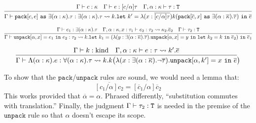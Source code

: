 \begin{judgment}
 \[
   \infer{\Gamma \vdash \pack{c}{e}{\exists(\alpha : \kappa).\tau}
     : \exists(\alpha : \kappa).\tau
     \leadsto k. \letv{k'}{\lambda(x : \overline{[c/\alpha]\tau})
     k(\pack{\overline{c}}{x}{\exists(\alpha : \kappabar).\taubar})}{\ebar}}
    {\Gamma \vdash c : \kappa
    &\Gamma \vdash e : [c/\alpha] \tau
    &\Gamma, \alpha : \kappa \vdash \tau : \T
    }
 \]

 \[
   \infer
     {\Gamma \vdash \unpack{\alpha}{x}{e_1}{e_2} : \tau_2
       \leadsto k. \letv{k_1}{(\lambda(y : \exists(\alpha : \kappabar).\taubar).
         \unpack{\alpha}{x}{y}{\letv{k_2}{k}{\ebar_2}})}{\ebar_1}}
     {\Gamma \vdash e_1 : \exists(\alpha : \kappa).\tau
     &\Gamma, \alpha : \kappa, x : \tau_1 \vdash e_2 : \tau_2 \leadsto \kappa_2.\ebar_2
     &\Gamma \vdash \tau_2 : \T
     }
 \]

 \[
   \infer{\Gamma \vdash \Lambda(\alpha : \kappa).e : \forall(\alpha : \kappa).\tau \leadsto
     k. k\big(\lambda(x : \exists(\alpha : \kappabar).\neg \taubar).
     \unpack{\alpha}{k'}{x}{\ebar}}
     {\Gamma \vdash k : \kind
     &\Gamma, \alpha : \kappa \vdash e : \tau \leadsto k' . \ebar
     }\big)
\]
\end{judgment}

To show that the $\mathtt{pack}$/$\mathtt{unpack}$ rules are sound, we would need
a lemma that:
\[ \overline{[c_1/\alpha]c_2} = [\overline{c}_1 / \alpha]\overline{c}_2 \]
This works provided that $\overline{\alpha} = \alpha$. Phrased differently,
``substitution commutes with translation.'' Finally, the judgment $\Gamma \vdash \tau_2 : \textnormal{\texttt{T}}$
is needed in the premise of the $\mathtt{unpack}$ rule so that $\alpha$ doesn't escape
its scope.
